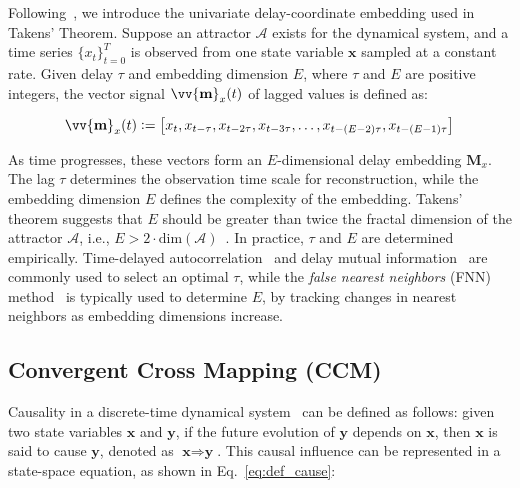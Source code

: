 
Following~\citep{vlachos2010nonuniform, butler2023causal}, we introduce the univariate delay-coordinate embedding used in Takens' Theorem. Suppose an attractor $\mathcal{A}$ exists for the dynamical system, and a time series $\{x_t\}_{t=0}^{T}$ is observed from one state variable $\textbf{x}$ sampled at a constant rate. Given delay $\tau$ and embedding dimension $E$, where $\tau$ and $E$ are positive integers, the vector signal $\vv{\textbf{m}}_{x}(t)$ of lagged values is defined as:

\begin{equation}
    \vv{\textbf{m}}_{x}(t) \vcentcolon= \left[x_{t},  x_{t-\tau},  x_{t-2\tau},  x_{t-3\tau},  \ldots,  x_{t-(E-2)\tau},  x_{t-(E-1)\tau}\right]
\end{equation}

As time progresses, these vectors form an $E$-dimensional delay embedding $\textbf{M}_x$. The lag $\tau$ determines the observation time scale for reconstruction, while the embedding dimension $E$ defines the complexity of the embedding. Takens' theorem suggests that $E$ should be greater than twice the fractal dimension of the attractor $\mathcal{A}$, i.e., $E > 2 \cdot \text{dim}(\mathcal{A})$~\citep{sauer1991j, kugiumtzis1996state}. In practice, $\tau$ and $E$ are determined empirically. Time-delayed autocorrelation~\citep{kugiumtzis1996state} and delay mutual information~\citep{fraser1986independent, klikova2011reconstruction} are commonly used to select an optimal $\tau$, while the \textit{false nearest neighbors} (FNN) method~\citep{kennel1992determining} is typically used to determine $E$, by tracking changes in nearest neighbors as embedding dimensions increase.

\subsection{Convergent Cross Mapping (CCM)}
\label{sec:uni-ccm}
Causality in a discrete-time dynamical system~\citep{butler2023causal,cummins2015efficacy} can be defined as follows: given two state variables $\textbf{x}$ and $\textbf{y}$, if the future evolution of $\textbf{y}$ depends on $\textbf{x}$, then $\textbf{x}$ is said to cause $\textbf{y}$, denoted as $\textbf{x} \Rightarrow \textbf{y}$. This causal influence can be represented in a state-space equation, as shown in Eq.~\ref{eq:def_cause}:

